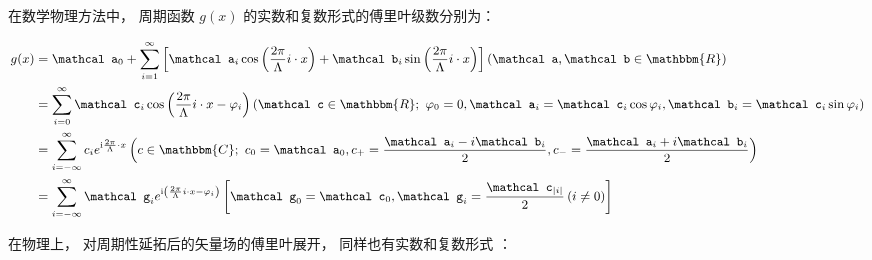 在数学物理方法中， 周期函数 $ g(x) $ 
的实数和复数形式的傅里叶级数分别为：

\begin{theorem}
	\begin{equation}\small
		\begin{split}
				g(x) &= {{\mathcal a}_0} + \sum\limits_{i = 1}^\infty  {\left[ {{{\mathcal a}_i}\cos \left( {\frac{{2\pi }}{\Lambda}i \cdot x} \right) + {{\mathcal b}_i}\sin \left( {\frac{{2\pi }}{\Lambda}i \cdot x} \right)} \right]} \left( {{\mathcal a},{\mathcal b} \in \mathbbm{R} } \right) \\
				&= \sum\limits_{i = 0}^\infty {{{{\mathcal c}_i}\cos \left( {\frac{{2\pi }}{\Lambda}i \cdot x - \varphi_i } \right)}} \left( {{\mathcal c} \in \mathbbm{R} ;\ 
				\varphi_0 = 0 , {{\mathcal a}_i} = {{\mathcal c}_i}\cos \varphi_i, {{\mathcal b}_i} = {{\mathcal c}_i}\sin \varphi_i } \right) \\
				&= \sum\limits_{i = - \infty }^\infty  {{c_i}{e^{{\mathrm i} \frac{2\pi}{\Lambda} \cdot x}}} \left( {c \in \mathbbm{C};\ {c_0} = {{\mathcal a}_0},{c_ + } = \frac{{{{\mathcal a}_i} - i{{\mathcal b}_i}}}{2},{c_ - } = \frac{{{{\mathcal a}_i} + i{{\mathcal b}_i}}}{2}} \right) \\
				&= \sum\limits_{i = - \infty }^\infty  {{\mathcal g}_i {e^{{\mathrm i} \left( {\frac{{2\pi }}{\Lambda}i \cdot x - \varphi_i } \right)}}} \left[ {\mathcal g}_0 = {\mathcal c}_0 , {\mathcal g}_i = \frac{{\mathcal c}_{\left| i \right|}}{2} \left( i \neq 0 \right) \right]
		\end{split}
	\end{equation}
\end{theorem}

在物理上， 对周期性延拓后的矢量场的傅里叶展开， 同样也有实数和复数形式 
：

